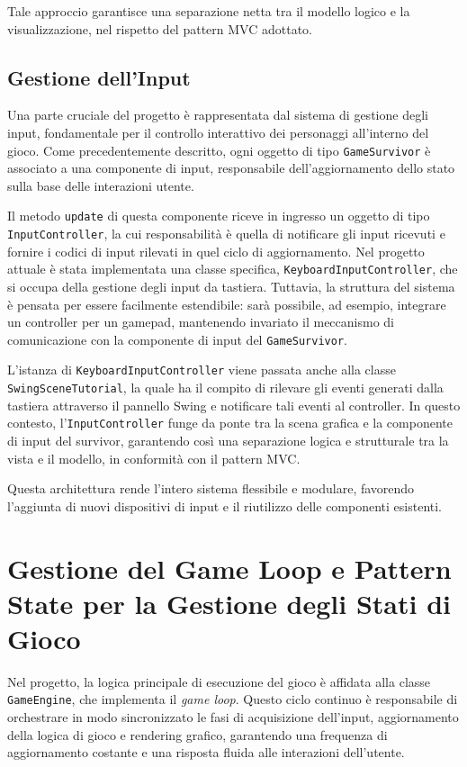 \documentclass[a4paper,12pt]{report}
\begin{document}
Tale approccio garantisce una separazione netta tra il modello logico e la visualizzazione, nel rispetto del pattern MVC adottato.
\subsection{Gestione dell'Input}

Una parte cruciale del progetto è rappresentata dal sistema di gestione degli input, fondamentale per il controllo interattivo dei personaggi all'interno del gioco. Come precedentemente descritto, ogni oggetto di tipo \texttt{GameSurvivor} è associato a una componente di input, responsabile dell'aggiornamento dello stato sulla base delle interazioni utente.

Il metodo \texttt{update} di questa componente riceve in ingresso un oggetto di tipo \texttt{InputController}, la cui responsabilità è quella di notificare gli input ricevuti e fornire i codici di input rilevati in quel ciclo di aggiornamento. Nel progetto attuale è stata implementata una classe specifica, \texttt{KeyboardInputController}, che si occupa della gestione degli input da tastiera. Tuttavia, la struttura del sistema è pensata per essere facilmente estendibile: sarà possibile, ad esempio, integrare un controller per un gamepad, mantenendo invariato il meccanismo di comunicazione con la componente di input del \texttt{GameSurvivor}.

L'istanza di \texttt{KeyboardInputController} viene passata anche alla classe \texttt{SwingSceneTutorial}, la quale ha il compito di rilevare gli eventi generati dalla tastiera attraverso il pannello Swing e notificare tali eventi al controller. In questo contesto, l'\texttt{InputController} funge da ponte tra la scena grafica e la componente di input del survivor, garantendo così una separazione logica e strutturale tra la vista e il modello, in conformità con il pattern MVC.

Questa architettura rende l'intero sistema flessibile e modulare, favorendo l'aggiunta di nuovi dispositivi di input e il riutilizzo delle componenti esistenti.
\section{Gestione del Game Loop e Pattern State per la Gestione degli Stati di Gioco}

Nel progetto, la logica principale di esecuzione del gioco è affidata alla classe \texttt{GameEngine}, che implementa il \emph{game loop}. Questo ciclo continuo è responsabile di orchestrare in modo sincronizzato le fasi di acquisizione dell’input, aggiornamento della logica di gioco e rendering grafico, garantendo una frequenza di aggiornamento costante e una risposta fluida alle interazioni dell’utente.
\end{document}
